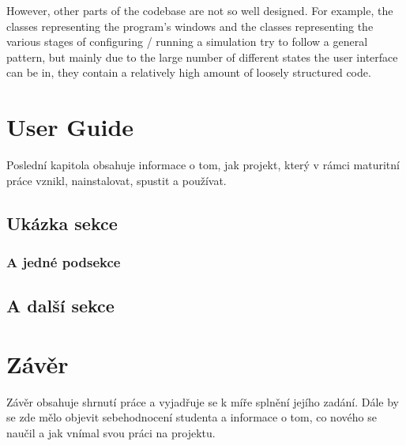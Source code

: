 \documentclass[11pt,a4paper,twoside,openright]{report}
\let\openright=\cleardoublepage
\begin{document}
However, other parts of the codebase are not so well designed. For example, the classes representing the program's windows and the classes representing the various stages of configuring / running a simulation try to follow a general pattern, but mainly due to the large number of different states the user interface can be in, they contain a relatively high amount of loosely structured code.

\chapter{User Guide}

Poslední kapitola obsahuje informace o tom, jak projekt, který v rámci maturitní práce vznikl, nainstalovat, spustit a používat.

\section{Ukázka sekce}

\lipsum[5]

\subsection{A jedné podsekce}

\lipsum

\section{A další sekce}

\lipsum

\chapter*{Závěr}
\pagestyle{empty}

Závěr obsahuje shrnutí práce a vyjadřuje se k míře splnění jejího zadání. Dále by se zde mělo objevit sebehodnocení studenta a informace o tom, co nového se naučil a jak vnímal svou práci na projektu.

\nocite{einstein}\nocite{latexcompanion}\nocite{knuthwebsite}
\printbibliography[title={Seznam použité literatury},heading={bibintoc}]

\openright
\listoffigures
{}

\clearpage
\listoftables
{}


\end{document}
